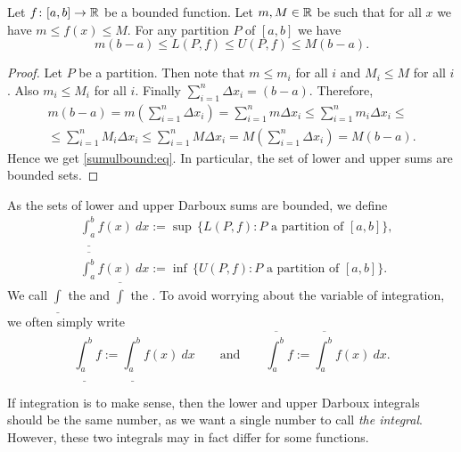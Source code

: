 \begin{prop} \label{sumulbound:prop}
Let $f \colon [a,b] \to {\mathbb{R}}$ be a bounded function.  Let $m, M \in {\mathbb{R}}$ be 
such that for all $x$ we have $m \leq f(x) \leq M$.  For any partition $P$ of $[a,b]$
we have
\begin{equation}
\label{sumulbound:eq}
m(b-a) \leq
L(P,f) \leq U(P,f)
\leq M(b-a) .
\end{equation}
\end{prop}

\begin{proof}
Let $P$ be a partition.  Then note that $m \leq m_i$ for all $i$ and
$M_i \leq M$ for all $i$.  Also $m_i \leq M_i$ for all $i$.  Finally
$\sum_{i=1}^n \Delta x_i = (b-a)$.  Therefore,
\begin{multline*}
m(b-a) =
m \left( \sum_{i=1}^n \Delta x_i \right)
=
\sum_{i=1}^n m \Delta x_i
\leq
\sum_{i=1}^n m_i \Delta x_i 
\leq
\\
\leq
\sum_{i=1}^n M_i \Delta x_i
\leq
\sum_{i=1}^n M \Delta x_i 
=
M \left( \sum_{i=1}^n \Delta x_i \right)
=
M(b-a) .
\end{multline*}
Hence we get \eqref{sumulbound:eq}.  In particular, the set of lower and
upper sums are bounded sets.
\end{proof}

\begin{defn}
As the sets of lower and upper Darboux sums are bounded, we define
\begin{align*}
& \underline{\int_a^b} f(x)~dx :=
\sup \, \bigl\{ L(P,f) : P \text{ a partition of $[a,b]$} \bigr\} , \\
& \overline{\int_a^b} f(x)~dx :=
\inf \, \bigl\{ U(P,f) : P \text{ a partition of $[a,b]$} \bigr\} .
\end{align*}
We call $\underline{\int}$
the \emph{} and
$\overline{\int}$ the
\emph{}.
To avoid worrying about the variable of integration, 
we often simply write
\begin{equation*}
\underline{\int_a^b} f :=
\underline{\int_a^b} f(x)~dx 
\qquad \text{and} \qquad
\overline{\int_a^b} f :=
\overline{\int_a^b} f(x)~dx  .
\end{equation*}
\end{defn}

If integration is to make sense, then the lower and upper Darboux
integrals should be the same number, as we want a single number to call
\emph{the integral}.  However, these two integrals may in fact differ for
some functions.

